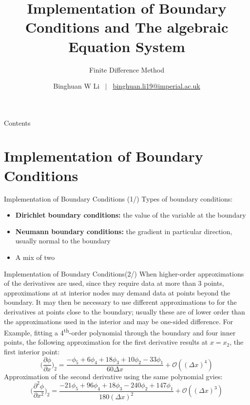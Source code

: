 \documentclass[10pt]{beamer}
\title{Implementation of Boundary Conditions and The algebraic Equation System}
\subtitle{Finite Difference Method\cite{Ferziger2002}}
\author{Binghuan W Li \ $\lvert$ \   \href{mailto:binghuan.li19@imperial.ac.uk}{binghuan.li19@imperial.ac.uk}}
\institute{Department of Bioengineering, Imperial College London}
\begin{document}
\maketitle
\begin{frame}{Contents}
\tableofcontents
\end{frame}
\section{Implementation of Boundary Conditions}
\begin{frame}{Implementation of Boundary Conditions (1/)}
Types of boundary conditions:
\begin{itemize}
    \item \textbf{Dirichlet boundary conditions:} the value of the variable at the boundary
    \item \textbf{Neumann boundary conditions:} the gradient in particular direction, usually normal to the boundary
    \item A mix of two
\end{itemize}
\end{frame}
\begin{frame}{Implementation of Boundary Conditions(2/)}
When higher-order approximations of the derivatives are used, since they require data at more than 3 points, approximations at at interior nodes may demand data at points beyond the boundary. It may then be necessary to use different approximations to for the derivatives at points close to the boundary; usually these are of lower order than the approximations used in the interior and may be one-sided difference. \newline \newline
For Example, fitting a 4\textsuperscript{th}-order polynomial through the boundary and four inner points, the following approximation for the first derivative results at $x=x_{2}$, the first interior point:
    \[
    \bigg( \frac{\partial \phi}{\partial x}\bigg)_{2} = 
    \frac{-\phi_{5}+6\phi_{4}+18\phi_{3}+10\phi_{2}-33\phi_{1}}{60\Delta x} + \mathcal{O}((\Delta x)^{4})
    \]
Approximation of the second derivative using the same polynomial gvies:
    \[
    \bigg( \frac{\partial^{2} \phi}{\partial x^{2}}\bigg)_{2} = \frac{-21\phi_{5}+96\phi_{4}+18\phi_{3}-240\phi_{2}+147\phi_{1}}{180(\Delta x)^2} + \mathcal{O}((\Delta x)^{3})
    \]
\end{frame}
\end{document}
